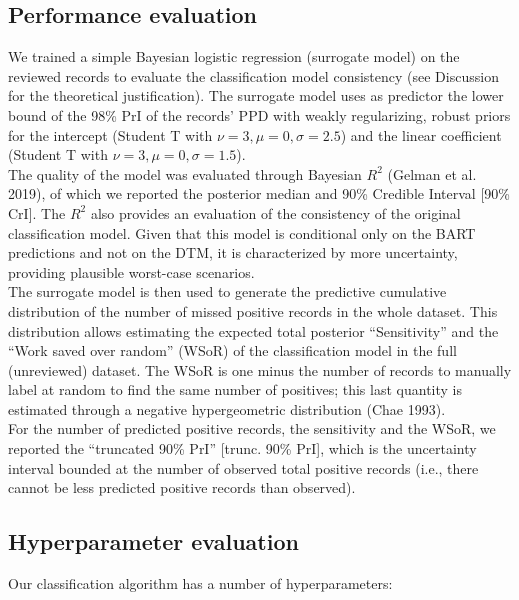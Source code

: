 \documentclass{article}
\begin{document}
\hypertarget{performance-evaluation}{%
\subsection{Performance evaluation}\label{performance-evaluation}}

We trained a simple Bayesian logistic regression (surrogate model) on
the reviewed records to evaluate the classification model consistency
(see Discussion for the theoretical justification). The surrogate model
uses as predictor the lower bound of the 98\% PrI of the records' PPD
with weakly regularizing, robust priors for the intercept (Student T
with \(\nu=3,\mu=0,\sigma=2.5\)) and the linear coefficient (Student T
with \(\nu=3,\mu=0,\sigma=1.5\)).\\
The quality of the model was evaluated through Bayesian \(R^2\) (Gelman
et al. 2019), of which we reported the posterior median and 90\%
Credible Interval {[}90\% CrI{]}. The \(R^2\) also provides an
evaluation of the consistency of the original classification model.
Given that this model is conditional only on the BART predictions and
not on the DTM, it is characterized by more uncertainty, providing
plausible worst-case scenarios.\\
The surrogate model is then used to generate the predictive cumulative
distribution of the number of missed positive records in the whole
dataset. This distribution allows estimating the expected total
posterior ``Sensitivity'' and the ``Work saved over random'' (WSoR) of
the classification model in the full (unreviewed) dataset. The WSoR is
one minus the number of records to manually label at random to find the
same number of positives; this last quantity is estimated through a
negative hypergeometric distribution (Chae 1993).\\
For the number of predicted positive records, the sensitivity and the
WSoR, we reported the ``truncated 90\% PrI'' {[}trunc. 90\% PrI{]},
which is the uncertainty interval bounded at the number of observed
total positive records (i.e., there cannot be less predicted positive
records than observed).

\hypertarget{hyperparameter-evaluation}{%
\subsection{Hyperparameter evaluation}\label{hyperparameter-evaluation}}

Our classification algorithm has a number of hyperparameters:
\end{document}
